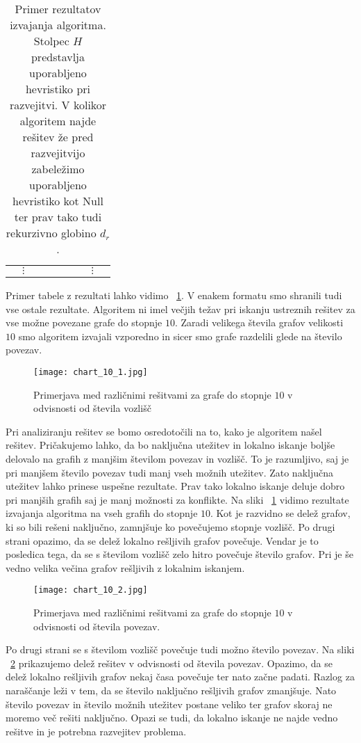 \documentclass[12pt,a4paper,twoside]{article}
\theoremstyle{definition} %
\theoremstyle{plain} %
\numberwithin{equation}{section}  %
\begin{document}
\begin{table}[]
\begin{tabular}{lllllllll}
                                   & $\vdots$                          &                                   &                                      &                                 &                                         &                                       & $\vdots$                              &                                    
\end{tabular}
\label{tbl:res}
\caption{Primer rezultatov izvajanja algoritma. Stolpec $H$ predstavlja uporabljeno hevristiko pri razvejitvi. V kolikor algoritem najde rešitev že pred razvejitvijo zabeležimo uporabljeno hevristiko kot Null ter prav tako tudi rekurzivno globino $d_r$.}
\end{table}
Primer tabele z rezultati lahko vidimo  ~\ref{tbl:res}. V enakem formatu smo shranili tudi vse ostale rezultate.
Algoritem ni imel večjih težav pri iskanju ustreznih rešitev za vse možne povezane grafe do stopnje $10$. Zaradi velikega števila grafov velikosti $10$ smo algoritem izvajali vzporedno in sicer smo grafe razdelili glede na število povezav.
 \begin{figure}[h!]
\caption{Primerjava med različnimi rešitvami za grafe do stopnje $10$ v odvisnosti od števila vozlišč}
\label{chart_10_1}
\centering
    \texttt{[image: chart\_10\_1.jpg]}
    \end{figure}

Pri analiziranju rešitev se bomo osredotočili na to, kako je algoritem našel rešitev. Pričakujemo lahko, da bo naključna utežitev in lokalno iskanje boljše delovalo na grafih z manjšim številom povezav in vozlišč. To je razumljivo, saj je pri manjšem število povezav tudi manj vseh možnih utežitev. Zato naključna utežitev lahko prinese uspešne rezultate. Prav tako lokalno iskanje deluje dobro pri manjših grafih saj je manj možnosti za konflikte. Na sliki ~\ref{chart_10_1} vidimo rezultate izvajanja algoritma na vseh grafih do stopnje $10$. Kot je razvidno se delež grafov, ki so bili rešeni naključno, zamnjšuje ko povečujemo stopnje vozlišč. Po drugi strani opazimo, da se delež lokalno rešljivih grafov povečuje. Vendar je to posledica tega, da se s številom vozlišč zelo hitro povečuje število grafov. Pri je še vedno velika večina grafov rešljivih z lokalnim iskanjem.
 \begin{figure}[h!]
\caption{Primerjava med različnimi rešitvami za grafe do stopnje $10$ v odvisnosti od števila povezav.}
\label{chart_10_2}
\centering
    \texttt{[image: chart\_10\_2.jpg]}
    \end{figure}
Po drugi strani se s številom vozlišč povečuje tudi možno število povezav. Na sliki ~\ref{chart_10_2} prikazujemo delež rešitev v odvisnosti od števila povezav. Opazimo, da se delež lokalno rešljivih grafov nekaj časa povečuje ter nato začne padati. Razlog za naraščanje leži v tem, da se število naključno rešljivih grafov zmanjšuje. Nato število povezav in število možnih utežitev postane veliko ter grafov skoraj ne moremo več rešiti naključno. Opazi se tudi, da lokalno iskanje ne najde vedno rešitve in je potrebna razvejitev problema.
\end{document}
